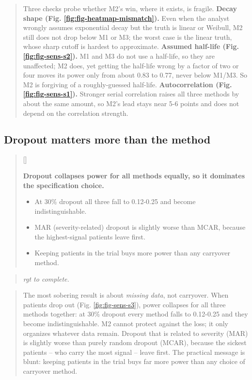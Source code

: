 \documentclass[
  11pt,
]{article}
\newcounter{pgraph}
\newenvironment{bullets}{%
  \stepcounter{pgraph}%
  \begin{quote}\small\sffamily\color[gray]{0.30}%
  {\normalfont\scriptsize\color[gray]{0.58}[\thepgraph]\enspace}}{%
  \end{quote}}
\newenvironment{rgt}{%
  \begin{quote}\small\itshape\color[RGB]{20,60,160}}{%
  \end{quote}}
\newenvironment{orig}{%
  \begin{quote}\normalsize\color[gray]{0.55}}{%
  \end{quote}}
\begin{document}
\begin{orig}
Three checks probe whether M2's win, where it exists, is fragile.
\textbf{Decay shape (Fig. \ref{fig:fig-heatmap-mismatch}).} Even when
the analyst wrongly assumes exponential decay but the truth is
linear or Weibull, M2 still does not drop below M1 or M3; the worst
case is the linear truth, whose sharp cutoff is hardest to
approximate. \textbf{Assumed half-life (Fig. \ref{fig:fig-sens-s2}).}
M1 and M3 do not use a half-life, so they are unaffected; M2 does,
yet getting the half-life wrong by a factor of two or four moves
its power only from about 0.83 to 0.77, never below M1/M3. So M2 is
forgiving of a roughly-guessed half-life. \textbf{Autocorrelation
(Fig. \ref{fig:fig-sens-s1}).} Stronger serial correlation raises
all three methods by about the same amount, so M2's lead stays near
5-6 points and does not depend on the correlation strength.

\end{orig}

\subsection{Dropout matters more than the method}\label{dropout-matters-more-than-the-method}

\begin{bullets}

\textbf{Dropout collapses power for all methods equally, so it
dominates the specification choice.}

\begin{itemize}\setlength{\itemsep}{2pt}\setlength{\parskip}{0pt}
\item At 30\% dropout all three fall to 0.12-0.25 and become
indistinguishable.
\item MAR (severity-related) dropout is slightly worse than MCAR,
because the highest-signal patients leave first.
\item Keeping patients in the trial buys more power than any
carryover method.
\end{itemize}

\end{bullets}

\begin{rgt}
rgt to complete.

\end{rgt}

\begin{orig}
The most sobering result is about \emph{missing data}, not carryover.
When patients drop out (Fig. \ref{fig:fig-sens-s3}), power
collapses for all three methods together: at 30\% dropout every
method falls to 0.12-0.25 and they become indistinguishable. M2
cannot protect against the loss; it only organizes whatever data
remain. Dropout that is related to severity (MAR) is slightly worse
than purely random dropout (MCAR), because the sickest patients --
who carry the most signal -- leave first. The practical message is
blunt: keeping patients in the trial buys far more power than any
choice of carryover method.

\end{orig}
\end{document}

